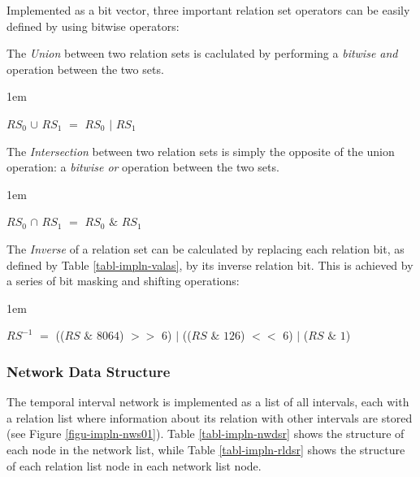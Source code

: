 \documentclass[11pt]{report}
\newenvironment{vquote}
{
  \begin{list}{}{\leftmargin 1em}\item[]
}
{
  \end{list}
}
\begin{document}
          Implemented as a bit vector, three important relation set operators
          can be easily defined by using bitwise operators:

          \begin{itemize}
            \item
              The {\em Union} between two relation sets is caclulated by
              performing a {\em bitwise and} operation between the two sets.

              \begin{vquote}
                $RS_0$ $\cup$ $RS_1$ $=$ $RS_0$ $|$ $RS_1$
              \end{vquote}

            \item
              The {\em Intersection} between two relation sets is simply the
              opposite of the union operation: a {\em bitwise or} operation
              between the two sets.

              \begin{vquote}
                $RS_0$ $\cap$ $RS_1$ $=$ $RS_0$ $\&$ $RS_1$
              \end{vquote}

            \item
              The {\em Inverse} of a relation set can be calculated by
              replacing each relation bit, as defined by Table
              \ref{tabl-impln-valas}, by its inverse relation bit. This
              is achieved by a series of bit masking and shifting operations:

              \begin{vquote}
                $RS^{-1}$ $=$
                  (($RS$ $\&$ $8064$) $>>$ $6$) $|$
                  (($RS$ $\&$ $126$)  $<<$ $6$) $|$
                  ($RS$ $\&$ $1$)
              \end{vquote}
          \end{itemize}

        \subsubsection{Network Data Structure}

          The temporal interval network is implemented as a list of all
          intervals, each with a relation list where information about its
          relation with other intervals are stored (see Figure
          \ref{figu-impln-nws01}). Table \ref{tabl-impln-nwdsr} shows the
          structure of each node in the network list, while Table
          \ref{tabl-impln-rldsr} shows the structure of each relation list
          node in each network list node.
\end{document}
